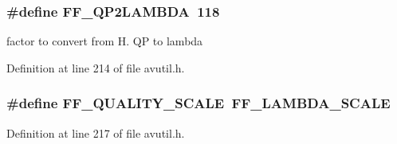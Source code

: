 \subsubsection[{\texorpdfstring{F\+F\+\_\+\+Q\+P2\+L\+A\+M\+B\+DA}{FF_QP2LAMBDA}}]{\setlength{\rightskip}{0pt plus 5cm}\#define F\+F\+\_\+\+Q\+P2\+L\+A\+M\+B\+DA~118}\hypertarget{group__lavu__enc_gad6ce86405f7381daad36ccf516b4da98}{}\label{group__lavu__enc_gad6ce86405f7381daad36ccf516b4da98}


factor to convert from H. QP to lambda 



Definition at line 214 of file avutil.\+h.

\subsubsection[{\texorpdfstring{F\+F\+\_\+\+Q\+U\+A\+L\+I\+T\+Y\+\_\+\+S\+C\+A\+LE}{FF_QUALITY_SCALE}}]{\setlength{\rightskip}{0pt plus 5cm}\#define F\+F\+\_\+\+Q\+U\+A\+L\+I\+T\+Y\+\_\+\+S\+C\+A\+LE~{\bf F\+F\+\_\+\+L\+A\+M\+B\+D\+A\+\_\+\+S\+C\+A\+LE}}\hypertarget{group__lavu__enc_gab1026a3e2eb8430ec938fffdc1bb2238}{}\label{group__lavu__enc_gab1026a3e2eb8430ec938fffdc1bb2238}


Definition at line 217 of file avutil.\+h.

